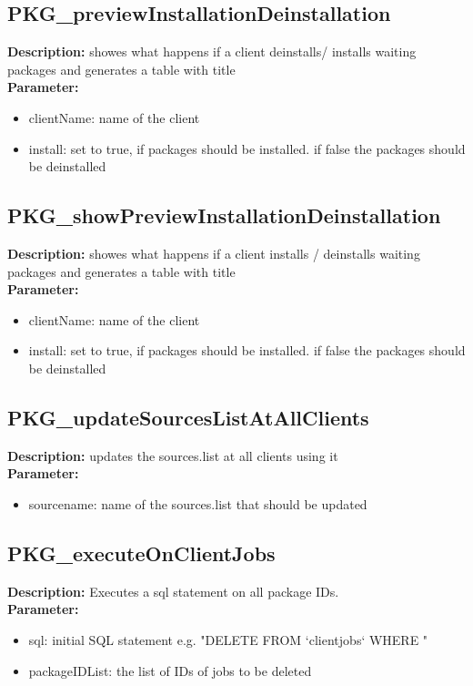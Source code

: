 \subsection{PKG\_previewInstallationDeinstallation}
\textbf{Description:} showes what happens if a client deinstalls/ installs waiting packages and generates a table with title\\
\textbf{Parameter:}
\begin{itemize}
\item clientName: name of the client
\item install: set to true, if packages should be installed. if false the packages should be deinstalled
\end{itemize}

\subsection{PKG\_showPreviewInstallationDeinstallation}
\textbf{Description:} showes what happens if a client installs / deinstalls waiting packages and generates a table with title\\
\textbf{Parameter:}
\begin{itemize}
\item clientName: name of the client
\item install: set to true, if packages should be installed. if false the packages should be deinstalled
\end{itemize}

\subsection{PKG\_updateSourcesListAtAllClients}
\textbf{Description:} updates the sources.list at all clients using it\\
\textbf{Parameter:}
\begin{itemize}
\item sourcename: name of the sources.list that should be updated
\end{itemize}

\subsection{PKG\_executeOnClientJobs}
\textbf{Description:} Executes a sql statement on all package IDs.\\
\textbf{Parameter:}
\begin{itemize}
\item sql: initial SQL statement e.g. "DELETE FROM `clientjobs` WHERE "
\item packageIDList: the list of IDs of jobs to be deleted
\end{itemize}

